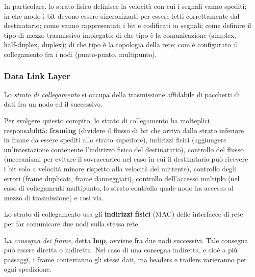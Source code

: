         \vspace{3mm}
        
        In particolare, lo strato fisico definisce la velocità con cui i segnali vanno spediti; in che modo i bit devono essere sincronizzati per essere letti correttamente dal destinatario; come vanno rappresentati i bit e codificati in segnali; come definire il tipo di mezzo trasmissivo impiegato; di che tipo è la comunicazione (simplex, half-duplex, duplex); di che tipo è la topologia della rete; com'è configurato il collegamento fra i nodi (punto-punto, multipunto).
        
        \subsubsection{Data Link Layer}
        
            Lo \textit{strato di collegamento} si occupa della trasmissione affidabile di pacchetti di dati fra un nodo ed il successivo. 
            
            \vspace{3mm}
            
            Per svolgere quiesto compito, lo strato di collegamento ha molteplici responsabilità: \textbf{framing} (dividere il flusso di bit che arriva dallo strato inferiore in frame da essere spediti allo strato superiore), indirizzi fisici (aggiungere un'intestazione contenente l'indirizzo fisico del destinatario), controllo del flusso (meccanismi per evitare il sovraccarico nel caso in cui il destinatario può ricevere i bit solo a velocità minore rispetto alla velocità del mittente), controllo degli errori (frame duplicati, frame danneggiati), controllo dell'accesso multiplo (nel caso di collegamenti multipunto, lo strato controlla quale nodo ha accesso al mezzo di trasmissione) e così via.
            
            \vspace{3mm}
            
            Lo strato di collegamento usa gli \textbf{indirizzi fisici} (MAC) delle interfacce di rete per far comunicare due nodi sulla stessa rete.
            
            \vspace{3mm}
            
            La \textit{consegna dei frame}, detta \textbf{hop}, avviene fra due nodi successivi. Tale consegna può essere diretta o indiretta. Nel caso di una consegna indiretta, e cioè a più passaggi, i frame conterranno gli stessi dati, ma headers e trailers varieranno per ogni spedizione. 
            
